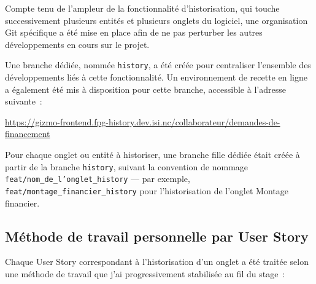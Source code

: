 Compte tenu de l'ampleur de la fonctionnalité d'historisation, qui
touche successivement plusieurs entités et plusieurs onglets du logiciel,
une organisation Git spécifique a été mise en place afin de ne pas
perturber les autres développements en cours sur le projet.

Une branche dédiée, nommée \texttt{history}, a été créée pour centraliser
l'ensemble des développements liés à cette fonctionnalité. Un
environnement de recette en ligne a également été mis à disposition pour
cette branche, accessible à l'adresse suivante~:

\begin{center}
  \url{https://gizmo-frontend.fpg-history.dev.isi.nc/collaborateur/demandes-de-financement}
\end{center}

Pour chaque onglet ou entité à historiser, une branche fille dédiée était
créée à partir de la branche \texttt{history}, suivant la convention de
nommage \texttt{feat/nom\_de\_l'onglet\_history} — par exemple,
\texttt{feat/montage\_financier\_history} pour l'historisation de
l'onglet Montage financier.

\subsection{Méthode de travail personnelle par User Story}

Chaque User Story correspondant à l'historisation d'un onglet a été
traitée selon une méthode de travail que j'ai progressivement stabilisée
au fil du stage~:

